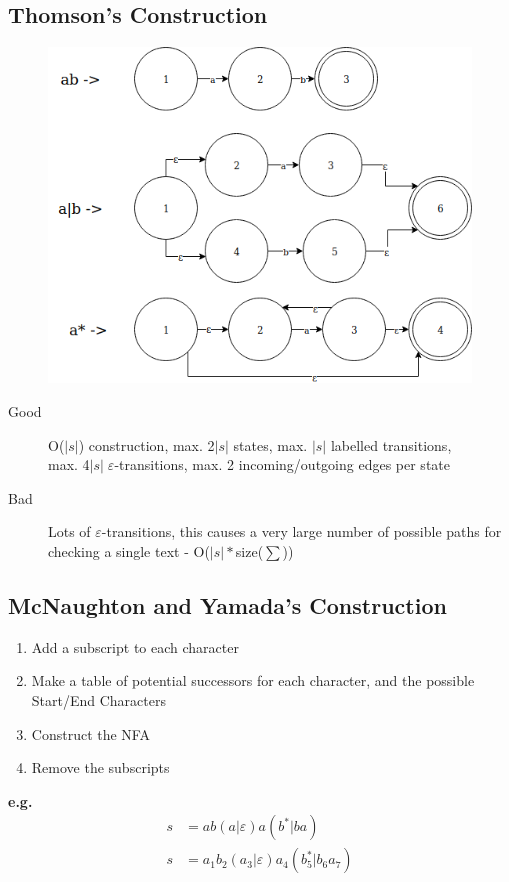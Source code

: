 \subsection{Thomson's Construction}
\begin{figure}[H]
    \centering
    \includegraphics[width=\textwidth]{Regex/Regex1.png}
    \label{fig:Regex1}
\end{figure}
\begin{description}
    \item[Good] O($|s|$) construction, max. 2$|s|$ states, max. $|s|$ labelled transitions, \\max. 4$|s|\; \varepsilon$-transitions, max. 2 incoming/outgoing edges per state
    \item[Bad] Lots of $\varepsilon$-transitions, this causes a very large number of possible paths for checking a single text - O($|s|*$size($\sum$))
\end{description}

\newpage
\subsection{McNaughton and Yamada's Construction}
\begin{enumerate}
    \item Add a subscript to each character
    \item Make a table of potential successors for each character, and the possible Start/End Characters
    \item Construct the NFA
    \item Remove the subscripts
\end{enumerate}
\textbf{e.g.}
\begin{align}
    s &= ab(a|\varepsilon)a(b^*|ba) \nonumber \\
    s &= a_1b_2(a_3|\varepsilon)a_4(b^*_5|b_6a_7) \nonumber 
\end{align}

